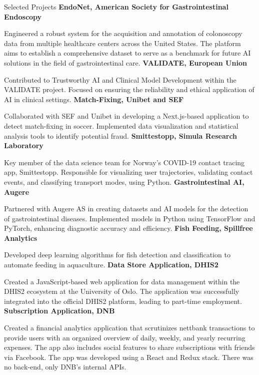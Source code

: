 \begin{rubric}{Selected Projects}
%
\entry*[2023]%
\textbf{EndoNet, American Society for Gastrointestinal Endoscopy} \par
Engineered a robust system for the acquisition and annotation of colonoscopy data from multiple healthcare centers across the United States. The platform aims to establish a comprehensive dataset to serve as a benchmark for future AI solutions in the field of gastrointestinal care.
%
\entry*[2023]%
\textbf{VALIDATE, European Union} \par 
Contributed to Trustworthy AI and Clinical Model Development within the VALIDATE project.
Focused on ensuring the reliability and ethical application of AI in clinical settings.
%
\entry*[2022]%
\textbf{Match-Fixing, Unibet and SEF} \par 
Collaborated with SEF and Unibet in developing a Next.js-based application to detect match-fixing in soccer.
Implemented data visualization and statistical analysis tools to identify potential fraud.
%
\entry*[2020]%
\textbf{Smittestopp, Simula Research Laboratory} \par
Key member of the data science team for Norway's COVID-19 contact tracing app, Smittestopp.
Responsible for visualizing user trajectories, validating contact events, and classifying transport modes, using Python.
%
\entry*[2019]%
\textbf{Gastrointestinal AI, Augere} \par
Partnered with Augere AS in creating datasets and AI models for the detection of gastrointestinal diseases.
Implemented models in Python using TensorFlow and PyTorch, enhancing diagnostic accuracy and efficiency.
%
\entry*[2018]%
\textbf{Fish Feeding, Spillfree Analytics} \par
Developed deep learning algorithms for fish detection and classification to automate feeding in aquaculture.
%
\entry*[2017]%
\textbf{Data Store Application, DHIS2} \par
Created a JavaScript-based web application for data management within the DHIS2 ecosystem at the University of Oslo.
The application was successfully integrated into the official DHIS2 platform, leading to part-time employment.
%
\entry*[2017]%
\textbf{Subscription Application, DNB} \par
Created a financial analytics application that scrutinizes nettbank transactions to provide users with an organized overview of daily, weekly, and yearly recurring expenses. The app also includes social features to share subscriptions with friends via Facebook. The app was developed using a React and Redux stack. There was no back-end, only DNB's internal APIs.
%
\end{rubric}